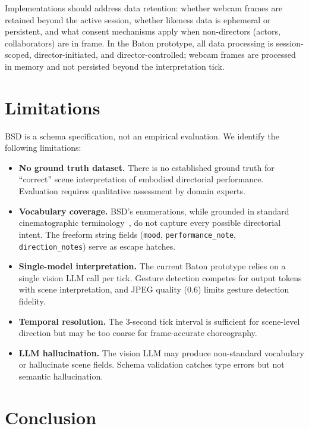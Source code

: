 \documentclass{article}
\begin{document}
Implementations should address data retention: whether webcam frames are retained beyond the active session, whether likeness data is ephemeral or persistent, and what consent mechanisms apply when non-directors (actors, collaborators) are in frame. In the Baton prototype, all data processing is session-scoped, director-initiated, and director-controlled; webcam frames are processed in memory and not persisted beyond the interpretation tick.

\section{Limitations}\label{sec:limitations}

BSD is a schema specification, not an empirical evaluation. We identify the following limitations:

\begin{itemize}
  \item \textbf{No ground truth dataset.} There is no established ground truth for ``correct'' scene interpretation of embodied directorial performance. Evaluation requires qualitative assessment by domain experts.
  \item \textbf{Vocabulary coverage.} BSD's enumerations, while grounded in standard cinematographic terminology~\cite{katz2019,brown2016}, do not capture every possible directorial intent. The freeform string fields (\texttt{mood}, \texttt{performance\_note}, \texttt{direction\_notes}) serve as escape hatches.
  \item \textbf{Single-model interpretation.} The current Baton prototype relies on a single vision LLM call per tick. Gesture detection competes for output tokens with scene interpretation, and JPEG quality (0.6) limits gesture detection fidelity.
  \item \textbf{Temporal resolution.} The 3-second tick interval is sufficient for scene-level direction but may be too coarse for frame-accurate choreography.
  \item \textbf{LLM hallucination.} The vision LLM may produce non-standard vocabulary or hallucinate scene fields. Schema validation catches type errors but not semantic hallucination.
\end{itemize}

\section{Conclusion}\label{sec:conclusion}
\end{document}
